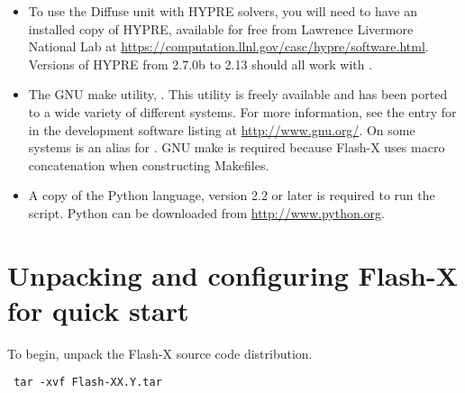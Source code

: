 \begin{itemize}
\item To use the Diffuse unit with HYPRE solvers, you will need to
  have an installed copy of HYPRE, available for free from Lawrence
  Livermore National Lab at \newline
\url{https://computation.llnl.gov/casc/hypre/software.html}.
Versions of HYPRE from 2.7.0b to 2.13 should all work with \flashx.


\item The GNU make utility, .  This utility is freely
available and has been ported to a wide variety of different
systems. For more information, see the entry for  in the
development software listing at \url{http://www.gnu.org/}.  On some
systems  is an alias for . GNU make is required
because Flash-X uses macro concatenation when
constructing Makefiles.

\item A copy of the Python language, version 2.2 or later is
required to run the  script. Python can be downloaded
from \url{http://www.python.org}.
\end{itemize}


\section{Unpacking and configuring Flash-X for quick start}
\label{unpack}

To begin, unpack the Flash-X source code distribution.
\begin{verbatim}
 tar -xvf Flash-XX.Y.tar
\end{verbatim}

